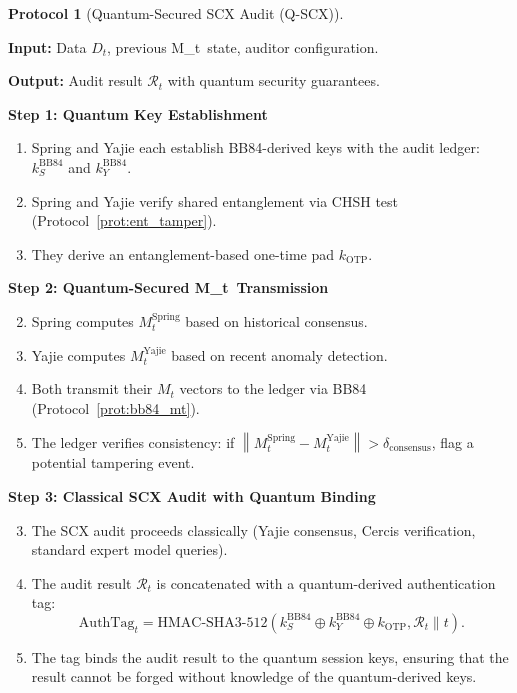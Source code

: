 \documentclass[11pt,a4paper]{article}
\theoremstyle{plain}
\theoremstyle{definition}
\newtheorem{protocol}[theorem]{Protocol}
\theoremstyle{remark}
\newcommand{\norm}[1]{\left\lVert#1\right\rVert}
\newcommand{\Mt}{M_t}
\newcommand{\AuditResult}{\mathcal{R}}
\begin{document}
\begin{protocol}[Quantum-Secured SCX Audit (Q-SCX)]\label{prot:qscx}

\textbf{Input:} Data $D_t$, previous \Mt\ state, auditor configuration.

\textbf{Output:} Audit result $\AuditResult_t$ with quantum security guarantees.

\medskip
\noindent\textbf{Step 1: Quantum Key Establishment}

\begin{enumerate}[label=1.\arabic*]
  \item Spring and Yajie each establish BB84-derived keys with the audit ledger:
        $k_S^{\text{BB84}}$ and $k_Y^{\text{BB84}}$.
  \item Spring and Yajie verify shared entanglement via CHSH test
        (Protocol~\ref{prot:ent_tamper}).
  \item They derive an entanglement-based one-time pad $k_{\text{OTP}}$.
\end{enumerate}

\medskip
\noindent\textbf{Step 2: Quantum-Secured \Mt\ Transmission}

\begin{enumerate}[label=2.\arabic*]
  \setcounter{enumi}{1}
  \item Spring computes $\Mt^{\text{Spring}}$ based on historical consensus.
  \item Yajie computes $\Mt^{\text{Yajie}}$ based on recent anomaly detection.
  \item Both transmit their $\Mt$ vectors to the ledger via BB84
        (Protocol~\ref{prot:bb84_mt}).
  \item The ledger verifies consistency: if
        $\norm{\Mt^{\text{Spring}} - \Mt^{\text{Yajie}}} > \delta_{\text{consensus}}$,
        flag a potential tampering event.
\end{enumerate}

\medskip
\noindent\textbf{Step 3: Classical SCX Audit with Quantum Binding}

\begin{enumerate}[label=3.\arabic*]
  \setcounter{enumi}{2}
  \item The SCX audit proceeds classically (Yajie consensus, Cercis verification,
        standard expert model queries).
  \item The audit result $\AuditResult_t$ is concatenated with a quantum-derived
        authentication tag:
        \[
        \text{AuthTag}_t = \text{HMAC-SHA3-512}(k_S^{\text{BB84}} \oplus
        k_Y^{\text{BB84}} \oplus k_{\text{OTP}}, \AuditResult_t \parallel t).
        \]
  \item The tag binds the audit result to the quantum session keys, ensuring
        that the result cannot be forged without knowledge of the quantum-derived
        keys.
\end{enumerate}


\end{protocol}
\end{document}
